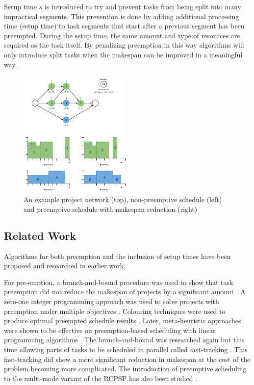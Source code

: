 Setup time \(s\) is introduced to try and prevent tasks from being split into many impractical segments. This prevention is done by adding additional processing time (setup time) to task segments that start after a previous segment has been preempted. During the setup time, the same amount and type of resources are required as the task itself. By penalizing preemption in this way algorithms will only introduce split tasks when the makespan can be improved in a meaningful way.

\begin{figure}
	\centering
    \includegraphics[width=0.5\textwidth]{PRCPSP-ST.png}
    \caption{An example project network (top), non-preemptive schedule (left) and preemptive schedule with makespan reduction (right)}
	\label{figure:figure1}
\end{figure}

\subsection{Related Work}
Algorithms for both preemption and the inclusion of setup times have been proposed and researched in earlier work.

For pre-emption, a branch-and-bound procedure was used to show that task preemption did not reduce the makespan of projects by a significant amount \cite{RN21}. A zero-one integer programming approach was used to solve projects with preemption under multiple objectives \cite{RN54}. Colouring techniques were used to produce optimal preempted schedule results \cite{RN55}. Later, meta-heuristic approaches were shown to be effective on preemption-based scheduling with linear programming algorithms \cite{RN57, RN56}. The branch-and-bound was researched again but this time allowing parts of tasks to be scheduled in parallel called fast-tracking \cite{RN7}. This fast-tracking did show a more significant reduction in makespan at the cost of the problem becoming more complicated. The introduction of preemptive scheduling to the multi-mode variant of the RCPSP has also been studied \cite{RN61, RN59, RN60}.

